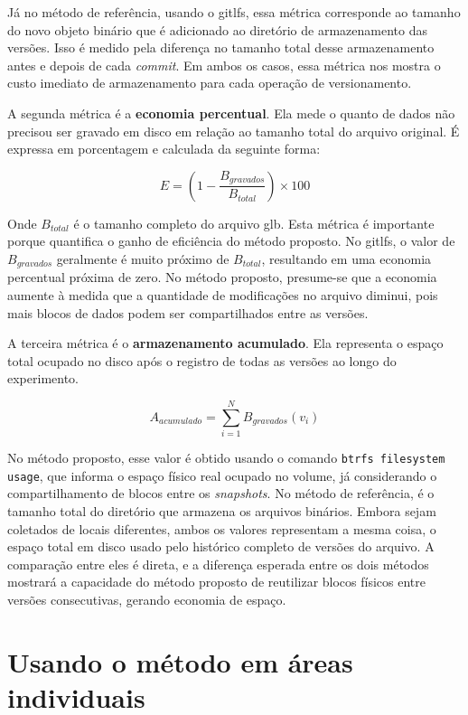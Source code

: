 Já no método de referência, usando o \gls{gitlfs}, essa métrica corresponde ao
tamanho do novo objeto binário que é adicionado ao diretório de armazenamento das
versões. Isso é medido pela diferença no tamanho total desse armazenamento antes e
depois de cada \textit{commit}. Em ambos os casos, essa métrica nos mostra o custo
imediato de armazenamento para cada operação de versionamento.

A segunda métrica é a \textbf{economia percentual}. Ela mede o quanto de dados não
precisou ser gravado em disco em relação ao tamanho total do arquivo original. É
expressa em porcentagem e calculada da seguinte forma:

\begin{equation}
  \label{eq:economia}
  E = \left( 1 - \frac{B_{gravados}}{B_{total}} \right) \times 100
\end{equation}

Onde $B_{total}$ é o tamanho completo do arquivo \gls{glb}. Esta métrica é
importante porque quantifica o ganho de eficiência do método proposto. No
\gls{gitlfs}, o valor de $B_{gravados}$ geralmente é muito próximo de $B_{total}$,
resultando em uma economia percentual próxima de zero. No método proposto,
presume-se que a economia aumente à medida que a quantidade de modificações no
arquivo diminui, pois mais blocos de dados podem ser compartilhados entre as
versões.

A terceira métrica é o \textbf{armazenamento acumulado}. Ela representa o espaço
total ocupado no disco após o registro de todas as versões ao longo do experimento.

\begin{equation}
  \label{eq:acumulado}
  A_{acumulado} = \sum_{i=1}^{N} B_{gravados}(v_i)
\end{equation}

No método proposto, esse valor é obtido usando o comando \texttt{btrfs filesystem
usage}, que informa o espaço físico real ocupado no volume, já considerando o
compartilhamento de blocos entre os \textit{snapshots}. No método de referência, é o
tamanho total do diretório que armazena os arquivos binários. Embora sejam coletados
de locais diferentes, ambos os valores representam a mesma coisa, o espaço total em
disco usado pelo histórico completo de versões do arquivo. A comparação entre eles é
direta, e a diferença esperada entre os dois métodos mostrará a capacidade do método
proposto de reutilizar blocos físicos entre versões consecutivas, gerando economia
de espaço.

\section{Usando o método em áreas individuais}

